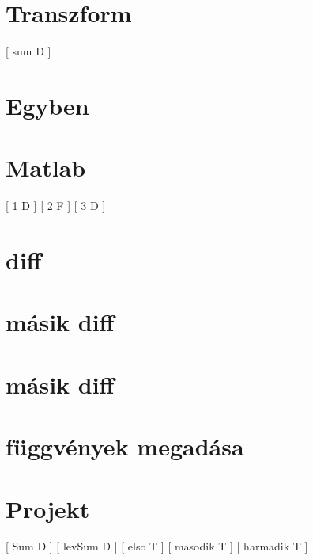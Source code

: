 \begin{spacing}{1.4}
\section*{Transzform} \label{DBfouriertransz}
 [ sum D ]
\vspace{0.5cm}
\newpage
\section*{Egyben} \label{DBfouriertranszsum}
\Desc{

}
\vspace{0.5cm}
\newpage
\section*{Matlab} \label{DBmatlab}
 [ 1 D ]
\newline
{}
 [ 2 F ]
\newline
{}
 [ 3 D ]
\vspace{0.5cm}
\newpage
\section*{diff} \label{DBmatlab1}
\Desc{

}
\vspace{0.5cm}
\newpage
\section*{másik diff} \label{DBmatlab2}
\Fa{

}
\vspace{0.5cm}
\newpage
\section*{másik diff} \label{DBmatlab2Mo}
\Mo{

}
\vspace{0.5cm}
\newpage
\section*{függvények megadása} \label{DBmatlab3}
\Desc{

}
\vspace{0.5cm}
\newpage
\section*{Projekt} \label{DBprojekt}
 [ Sum D ]
\newline
{}
 [ levSum D ]
\newline
{}
 [ elso T ]
\newline
{}
 [ masodik T ]
\newline
{}
 [ harmadik T ]
\vspace{0.5cm}
\newpage

\end{spacing}
